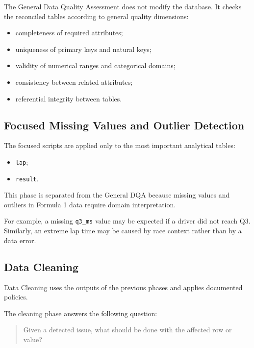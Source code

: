\documentclass[a4paper,11pt]{article}
\begin{document}
	The General Data Quality Assessment does not modify the database.
	It checks the reconciled tables according to general quality dimensions:
	
	\begin{itemize}[leftmargin=1.2cm]
		\item completeness of required attributes;
		\item uniqueness of primary keys and natural keys;
		\item validity of numerical ranges and categorical domains;
		\item consistency between related attributes;
		\item referential integrity between tables.
	\end{itemize}
	

	
	\subsection{Focused Missing Values and Outlier Detection}
	
	The focused scripts are applied only to the most important analytical tables:
	
	\begin{itemize}[leftmargin=1.2cm]
		\item \texttt{lap};
		\item \texttt{result}.
	\end{itemize}
	
	This phase is separated from the General DQA because missing values and outliers in Formula 1 data require domain interpretation.
	
	For example, a missing \texttt{q3\_ms} value may be expected if a driver did not reach Q3.
	Similarly, an extreme lap time may be caused by race context rather than by a data error.
	
	\subsection{Data Cleaning}
	
	Data Cleaning uses the outputs of the previous phases and applies documented policies.
	
	The cleaning phase answers the following question:
	
	\begin{quote}
		Given a detected issue, what should be done with the affected row or value?
	\end{quote}
	
\end{document}
